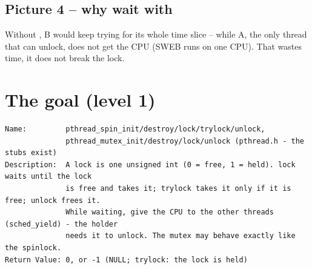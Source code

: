 \documentclass[11pt]{report}
\begin{document}
\subsection*{Picture 4 -- why wait with }

\begin{center}
\end{center}
Without , B would keep trying for its whole time slice -- while A, the only thread
that can unlock, does not get the CPU (SWEB runs on one CPU). That wastes time, it does not break
the lock.

\clearpage
\section*{The goal (level 1)}

\begin{lstlisting}[language={},basicstyle=\ttfamily\footnotesize]
Name:         pthread_spin_init/destroy/lock/trylock/unlock,
              pthread_mutex_init/destroy/lock/unlock (pthread.h - the stubs exist)
Description:  A lock is one unsigned int (0 = free, 1 = held). lock waits until the lock
              is free and takes it; trylock takes it only if it is free; unlock frees it.
              While waiting, give the CPU to the other threads (sched_yield) - the holder
              needs it to unlock. The mutex may behave exactly like the spinlock.
Return Value: 0, or -1 (NULL; trylock: the lock is held)
\end{lstlisting}
\end{document}
